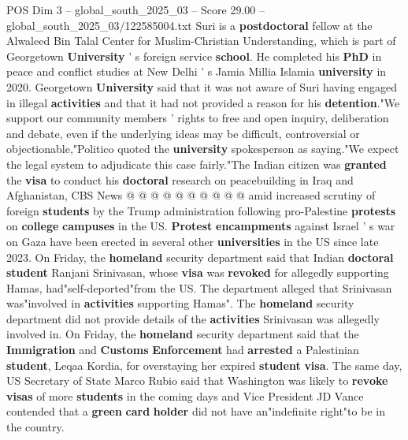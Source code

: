 \begin{textsample}{POS Dim 3 – global\_south\_2025\_03 – Score 29.00 – global\_south\_2025\_03/122585004.txt}
Suri is a \textbf{postdoctoral} fellow at the Alwaleed Bin Talal Center for Muslim-Christian Understanding, which is part of Georgetown \textbf{University} ' s foreign service \textbf{school}.
He completed his \textbf{PhD} in peace and conflict studies at New Delhi ' s Jamia Millia Islamia \textbf{university} in 2020.
Georgetown \textbf{University} said that it was not aware of Suri having engaged in illegal \textbf{activities} and that it had not provided a reason for his \textbf{detention}."We support our community members ' rights to free and open inquiry, deliberation and debate, even if the underlying ideas may be difficult, controversial or objectionable,"Politico quoted the \textbf{university} spokesperson as saying."We expect the legal system to adjudicate this case fairly."The Indian citizen was \textbf{granted} the \textbf{visa} to conduct his \textbf{doctoral} research on peacebuilding in Iraq and Afghanistan, CBS News @ @ @ @ @ @ @ @ @ @ amid increased scrutiny of foreign \textbf{students} by the Trump administration following pro-Palestine \textbf{protests} on \textbf{college} \textbf{campuses} in the US. \textbf{Protest} \textbf{encampments} against Israel ' s war on Gaza have been erected in several other \textbf{universities} in the US since late 2023.
On Friday, the \textbf{homeland} security department said that Indian \textbf{doctoral} \textbf{student} Ranjani Srinivasan, whose \textbf{visa} was \textbf{revoked} for allegedly supporting Hamas, had"self-deported"from the US.
The department alleged that Srinivasan was"involved in \textbf{activities} supporting Hamas".
The \textbf{homeland} security department did not provide details of the \textbf{activities} Srinivasan was allegedly involved in.
On Friday, the \textbf{homeland} security department said that the \textbf{Immigration} and \textbf{Customs} \textbf{Enforcement} had \textbf{arrested} a Palestinian \textbf{student}, Leqaa Kordia, for overstaying her expired \textbf{student} \textbf{visa}.
The same day, US Secretary of State Marco Rubio said that Washington was likely to \textbf{revoke} \textbf{visas} of more \textbf{students} in the coming days and Vice President JD Vance contended that a \textbf{green} \textbf{card} \textbf{holder} did not have an"indefinite right"to be in the country.

\end{textsample}
